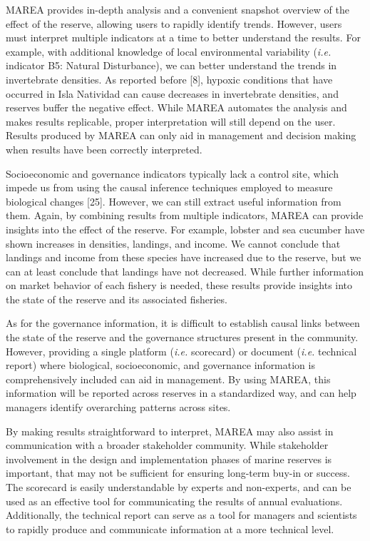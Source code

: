 \documentclass[12pt,]{article}
\begin{document}
MAREA provides in-depth analysis and a convenient snapshot overview of
the effect of the reserve, allowing users to rapidly identify trends.
However, users must interpret multiple indicators at a time to better
understand the results. For example, with additional knowledge of local
environmental variability (\emph{i.e.} indicator B5: Natural
Disturbance), we can better understand the trends in invertebrate
densities. As reported before {[}8{]}, hypoxic conditions that have
occurred in Isla Natividad can cause decreases in invertebrate
densities, and reserves buffer the negative effect. While MAREA
automates the analysis and makes results replicable, proper
interpretation will still depend on the user. Results produced by MAREA
can only aid in management and decision making when results have been
correctly interpreted.

Socioeconomic and governance indicators typically lack a control site,
which impede us from using the causal inference techniques employed to
measure biological changes {[}25{]}. However, we can still extract
useful information from them. Again, by combining results from multiple
indicators, MAREA can provide insights into the effect of the reserve.
For example, lobster and sea cucumber have shown increases in densities,
landings, and income. We cannot conclude that landings and income from
these species have increased due to the reserve, but we can at least
conclude that landings have not decreased. While further information on
market behavior of each fishery is needed, these results provide
insights into the state of the reserve and its associated fisheries.

As for the governance information, it is difficult to establish causal
links between the state of the reserve and the governance structures
present in the community. However, providing a single platform
(\emph{i.e.} scorecard) or document (\emph{i.e.} technical report) where
biological, socioeconomic, and governance information is comprehensively
included can aid in management. By using MAREA, this information will be
reported across reserves in a standardized way, and can help managers
identify overarching patterns across sites.

By making results straightforward to interpret, MAREA may also assist in
communication with a broader stakeholder community. While stakeholder
involvement in the design and implementation phases of marine reserves
is important, that may not be sufficient for ensuring long-term buy-in
or success. The scorecard is easily understandable by experts and
non-experts, and can be used as an effective tool for communicating the
results of annual evaluations. Additionally, the technical report can
serve as a tool for managers and scientists to rapidly produce and
communicate information at a more technical level.
\end{document}
